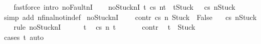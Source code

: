 \begin{isabellebody}
\ \ \isamarkupfalse%
\ {\isacharparenleft}fastforce\ intro{\isacharcolon}\ noFaultnI{\isacharprime}{\isacharparenright}\isanewline
\ \ \isamarkupfalse%
%
\endisatagproof
{\isafoldproof}%
%
\isadelimproof
\isanewline
%
\endisadelimproof
\isanewline
{}\isamarkupfalse%
\ noStucknI{\isacharcolon}\ {\isachardoublequoteopen}{\isasymlbrakk}{\isasymAnd}t{\isachardot}\ {\isasymGamma}{\isasymturnstile}{\isasymlangle}c{\isacharcomma}s{\isasymrangle}\ {\isacharequal}n{\isasymRightarrow}t\ {\isasymLongrightarrow}\ t{\isasymnoteq}Stuck{\isasymrbrakk}\ {\isasymLongrightarrow}\ \ {\isasymGamma}{\isasymturnstile}{\isasymlangle}c{\isacharcomma}s{\isasymrangle}\ {\isacharequal}n{\isasymRightarrow}{\isasymnotin}{\isacharbraceleft}Stuck{\isacharbraceright}{\isachardoublequoteclose}\ \isanewline
%
\isadelimproof
\ \ %
\endisadelimproof
%
\isatagproof
{}\isamarkupfalse%
\ {\isacharparenleft}simp\ add{\isacharcolon}\ nfinal{\isacharunderscore}notin{\isacharunderscore}def{\isacharparenright}%
\endisatagproof
{\isafoldproof}%
%
\isadelimproof
\isanewline
%
\endisadelimproof
\isanewline
{}\isamarkupfalse%
\ noStucknI{\isacharprime}{\isacharcolon}\ \isanewline
\ \ \ contr{\isacharcolon}\ {\isachardoublequoteopen}{\isasymGamma}{\isasymturnstile}{\isasymlangle}c{\isacharcomma}s{\isasymrangle}\ {\isacharequal}n{\isasymRightarrow}\ Stuck\ {\isasymLongrightarrow}\ False{\isachardoublequoteclose}\isanewline
\ \ \ {\isachardoublequoteopen}{\isasymGamma}{\isasymturnstile}{\isasymlangle}c{\isacharcomma}s{\isasymrangle}\ {\isacharequal}n{\isasymRightarrow}{\isasymnotin}{\isacharbraceleft}Stuck{\isacharbraceright}{\isachardoublequoteclose}\isanewline
%
\isadelimproof
\ \ %
\endisadelimproof
%
\isatagproof
{}\isamarkupfalse%
\ {\isacharparenleft}rule\ noStucknI{\isacharparenright}\isanewline
\ \ \ \ \isamarkupfalse%
\ t\ \isamarkupfalse%
\ {\isachardoublequoteopen}{\isasymGamma}{\isasymturnstile}{\isasymlangle}c{\isacharcomma}s{\isasymrangle}\ {\isacharequal}n{\isasymRightarrow}\ t{\isachardoublequoteclose}\ \isanewline
\ \ \ \ \isamarkupfalse%
\ contr\ \isamarkupfalse%
\ {\isachardoublequoteopen}t\ {\isasymnoteq}\ Stuck{\isachardoublequoteclose}\isanewline
\ \ \ \ \ \ \isamarkupfalse%
\ {\isacharparenleft}cases\ t{\isacharparenright}\ auto\isanewline
\ \ \isamarkupfalse%
%
\endisatagproof
{\isafoldproof}%
%
\isadelimproof
\isanewline
%
\endisadelimproof
\isanewline

\end{isabellebody}
